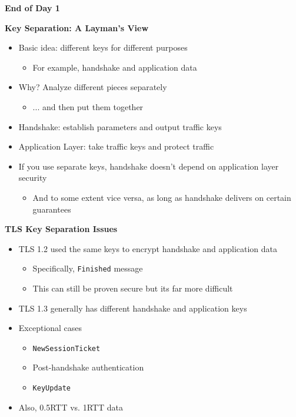 \documentclass[helvetica]{seminar}
\newcommand{\heading}[1]{%
  \begin{center} 
    \large\bf 
    #1 
  \end{center} 
  \vspace{.4 in}}
\begin{document}
\begin{slide}
\heading{End of Day 1}

\end{slide}


\begin{slide}
\heading{Key Separation: A Layman's View}

\begin{itemize}
\item Basic idea: different keys for different purposes
  \begin{itemize}
  \item For example, handshake and application data
  \end{itemize}

\item Why? Analyze different pieces separately
  \begin{itemize}
  \item ... and then put them together
  \end{itemize}

\item Handshake: establish parameters and output traffic keys
\item Application Layer: take traffic keys and protect traffic
\item If you use separate keys, handshake doesn't depend on application layer security
  \begin{itemize}
  \item And to some extent vice versa, as long as handshake delivers on certain guarantees
  \end{itemize}
\end{itemize}
\end{slide}


\begin{slide}
\heading{TLS Key Separation Issues}

\begin{itemize}
\item TLS 1.2 used the same keys to encrypt handshake and application data
  \begin{itemize}
  \item Specifically, \verb^Finished^ message
  \item This can still be proven secure but its far more difficult
  \end{itemize}

\item TLS 1.3 generally has different handshake and application keys
\item Exceptional cases
  \begin{itemize}
  \item \verb^NewSessionTicket^
  \item Post-handshake authentication
  \item \verb^KeyUpdate^
  \end{itemize}

\item Also, 0.5RTT vs. 1RTT data
\end{itemize}
\end{slide}
\end{document}
